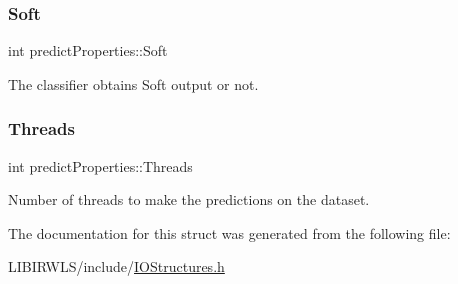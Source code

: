 \subsubsection{\texorpdfstring{Soft}{Soft}}
{\ttfamily int predict\+Properties\+::\+Soft}

The classifier obtains Soft output or not. \hypertarget{structpredictProperties_a602116e0d46424243cb4c971c03695e1}{}\label{structpredictProperties_a602116e0d46424243cb4c971c03695e1} 
\subsubsection{\texorpdfstring{Threads}{Threads}}
{\ttfamily int predict\+Properties\+::\+Threads}

Number of threads to make the predictions on the dataset. 

The documentation for this struct was generated from the following file\+:\begin{DoxyCompactItemize}
\item 
L\+I\+B\+I\+R\+W\+L\+S/include/\hyperlink{IOStructures_8h}{I\+O\+Structures.\+h}\end{DoxyCompactItemize}
